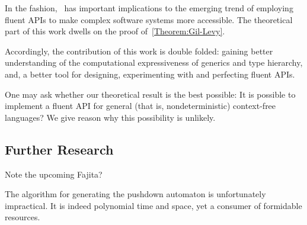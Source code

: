 In the fashion,~ has important
  implications to the emerging trend of employing fluent APIs
  to make complex software systems more accessible.
The theoretical part of this work dwells on the proof of~\cref{Theorem:Gil-Levy}.

Accordingly, the contribution of this work is double folded:
  gaining better understanding of the computational expressiveness of
  \Java generics and type hierarchy, and, a better tool
  for designing, experimenting with and perfecting fluent APIs.

One may ask whether our theoretical result is the
  best possible:
It is possible to implement a fluent API for general
  (that is, nondeterministic) context-free languages?
  We give reason why this possibility is unlikely.

\subsection{Further Research}
Note the upcoming \textsf{Fajita}?

The algorithm for generating the pushdown automaton is unfortunately impractical.
It is indeed polynomial time and space,
  yet a consumer of formidable resources.
